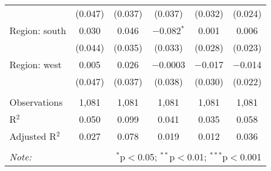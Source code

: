 \begin{tabular}{@{\extracolsep{5pt}}lccccc}
  & (0.047) & (0.037) & (0.037) & (0.032) & (0.024) \\ 
  Region: south & 0.030 & 0.046 & $-$0.082$^{*}$ & 0.001 & 0.006 \\ 
  & (0.044) & (0.035) & (0.033) & (0.028) & (0.023) \\ 
  Region: west & 0.005 & 0.026 & $-$0.0003 & $-$0.017 & $-$0.014 \\ 
  & (0.047) & (0.037) & (0.038) & (0.030) & (0.022) \\ 
 \hline \\[-1.8ex] 
Observations & 1,081 & 1,081 & 1,081 & 1,081 & 1,081 \\ 
R$^{2}$ & 0.050 & 0.099 & 0.041 & 0.035 & 0.058 \\ 
Adjusted R$^{2}$ & 0.027 & 0.078 & 0.019 & 0.012 & 0.036 \\ 
\hline 
\hline \\[-1.8ex] 
\textit{Note:}  & \multicolumn{5}{r}{$^{*}$p$<$0.05; $^{**}$p$<$0.01; $^{***}$p$<$0.001} \\ 
\end{tabular} 
